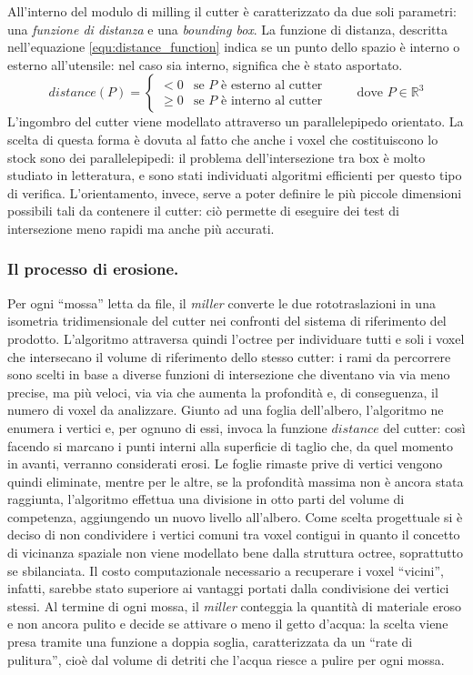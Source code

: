 All'interno del modulo di milling il cutter è caratterizzato da due soli parametri: una \emph{funzione di distanza} e una \emph{bounding box}. La funzione di distanza, descritta nell'equazione \eqref{equ:distance_function} indica se un punto dello spazio è interno o esterno all'utensile: nel caso sia interno, significa che è stato asportato.
\begin{equation} \label{equ:distance_function}
	distance(P) = 
		\begin{cases}
			< 0 & \text{se $P$ è esterno al cutter} \\
			\geq 0 & \text{se $P$ è interno al cutter}
		\end{cases}
	\qquad \text{ dove } P \in \mathbb{R}^3
\end{equation}
L'ingombro del cutter viene modellato attraverso un parallelepipedo orientato. La scelta di questa forma è dovuta al fatto che anche i voxel che costituiscono lo stock sono dei parallelepipedi: il problema dell'intersezione tra box è molto studiato in letteratura, e sono stati individuati algoritmi efficienti per questo tipo di verifica. L'orientamento, invece, serve a poter definire le più piccole dimensioni possibili tali da contenere il cutter: ciò permette di eseguire dei test di intersezione meno rapidi ma anche più accurati.

\subsubsection{Il processo di erosione.}
Per ogni ``mossa'' letta da file, il \emph{miller} converte le due rototraslazioni in una isometria tridimensionale del cutter nei confronti del sistema di riferimento del prodotto. L'algoritmo attraversa quindi l'octree per individuare tutti e soli i voxel che intersecano il volume di riferimento dello stesso cutter: i rami da percorrere sono scelti in base a diverse funzioni di intersezione che diventano via via meno precise, ma più veloci, via via che aumenta la profondità e, di conseguenza, il numero di voxel da analizzare. Giunto ad una foglia dell'albero, l'algoritmo ne enumera i vertici e, per ognuno di essi, invoca la funzione $distance$ del cutter: così facendo si marcano i punti interni alla superficie di taglio che, da quel momento in avanti, verranno considerati erosi.
Le foglie rimaste prive di vertici vengono quindi eliminate, mentre per le altre, se la profondità massima non è ancora stata raggiunta, l'algoritmo effettua una divisione in otto parti del volume di competenza, aggiungendo un nuovo livello all'albero. Come scelta progettuale si è deciso di non condividere i vertici comuni tra voxel contigui in quanto il concetto di vicinanza spaziale non viene modellato bene dalla struttura octree, soprattutto se sbilanciata. Il costo computazionale necessario a recuperare i voxel ``vicini'', infatti, sarebbe stato superiore ai vantaggi portati dalla condivisione dei vertici stessi. Al termine di ogni mossa, il \emph{miller} conteggia la quantità di materiale eroso e non ancora pulito e decide se attivare o meno il getto d'acqua: la scelta viene presa tramite una funzione a doppia soglia, caratterizzata da un ``rate di pulitura'', cioè dal volume di detriti che l'acqua riesce a pulire per ogni mossa.

